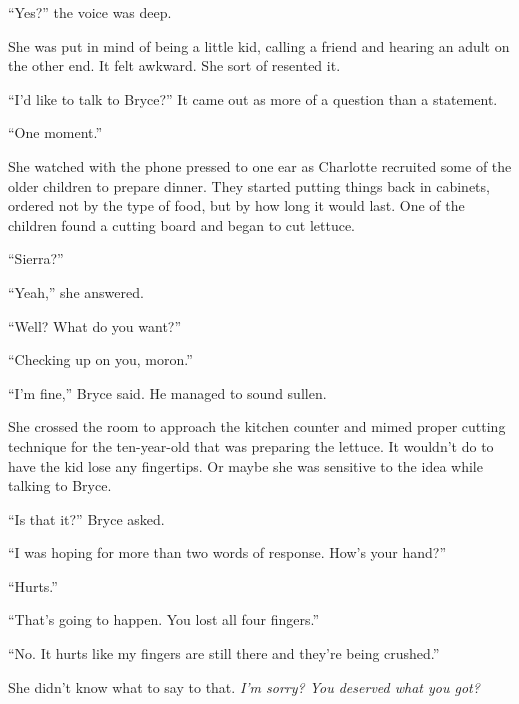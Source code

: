 ``Yes?'' the voice was deep.



She was put in mind of being a little kid, calling a friend and hearing an adult on the other end.  It felt awkward.  She sort of resented it.



``I'd like to talk to Bryce?''  It came out as more of a question than a statement.



``One moment.''



She watched with the phone pressed to one ear as Charlotte recruited some of the older children to prepare dinner.  They started putting things back in cabinets, ordered not by the type of food, but by how long it would last.  One of the children found a cutting board and began to cut lettuce.



``Sierra?''



``Yeah,'' she answered.



``Well?  What do you want?''



``Checking up on you, moron.''



``I'm fine,'' Bryce said.  He managed to sound sullen.



She crossed the room to approach the kitchen counter and mimed proper cutting technique for the ten-year-old that was preparing the lettuce.  It wouldn't do to have the kid lose any fingertips.  Or maybe she was sensitive to the idea while talking to Bryce.



``Is that it?'' Bryce asked.



``I was hoping for more than two words of response.  How's your hand?''



``Hurts.''



``That's going to happen.  You lost all four fingers.''



``No.  It hurts like my fingers are still there and they're being crushed.''



She didn't know what to say to that.  \emph{I'm sorry?  You deserved what you got?}



